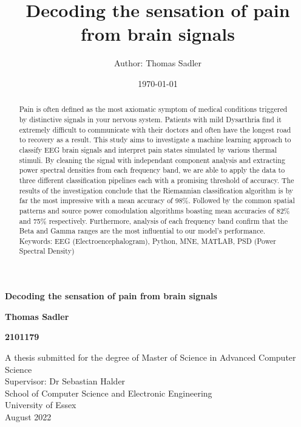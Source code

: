\documentclass[11pt]{article}
\title{Decoding the sensation of pain from brain signals}
\author{Author: Thomas Sadler}
\date{\today}
\begin{document}
\begin{titlepage}
   \begin{center}
       \vspace*{5cm}
       \Large
       \textbf{Decoding the sensation of pain from brain signals}

       \vspace{1.5cm}
       \normalsize
       \textbf{Thomas Sadler}

       \vspace{0.5cm}
       \normalsize
       \textbf{2101179}
       
                   
       \vspace{4cm}
       \normalsize
       A thesis submitted for the degree of Master of Science in Advanced Computer Science \\


       \vspace{2cm}
       \normalsize
       Supervisor: Dr Sebastian Halder \\
       School of Computer Science and Electronic Engineering \\
       University of Essex \\

       \vspace{0.5cm} 
       \normalsize
       August 2022 \\
            
   \end{center}
\end{titlepage}

\begin{abstract}

Pain is often defined as the most axiomatic symptom of medical conditions triggered by distinctive signals in your nervous system. Patients with mild Dysarthria find it extremely difficult to communicate with their doctors and often have the longest road to recovery as a result. This study aims to investigate a machine learning approach to classify EEG brain signals and interpret pain states simulated by various thermal stimuli. By cleaning the signal with independant component analysis and extracting power spectral densities from each frequency band, we are able to apply the data to three different classification pipelines each with a promising threshold of accuracy. The results of the investigation conclude that the Riemannian classification algorithm is by far the most impressive with a mean accuracy of 98\%. Followed by the common spatial patterns and source power comodulation algorithms boasting mean accuracies of 82\% and 75\% respectively. Furthermore, analysis of each frequency band confirm that the Beta and Gamma ranges are the most influential to our model's performance.
\newline
\newline
Keywords: EEG (Electroencephalogram), Python, MNE, MATLAB, PSD (Power Spectral Density)
\end{abstract}
\end{document}
